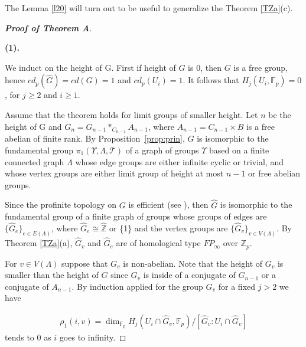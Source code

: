 \documentclass[10pt]{amsart}
\theoremstyle{plain}
\theoremstyle{definition}
\theoremstyle{remark}
\numberwithin{prop}{section}
\numberwithin{example}{section}
\numberwithin{equation}{section}
\newcommand{\Z}{\mathbb{Z}}
\newcommand{\F}{\mathbb{F}}
\newcommand{\caT}{\mathcal{T}}
\begin{document}
	The Lemma \ref{l20}  will  turn out to be useful to generalize  the Theorem \ref{TZa}(c). 
\begin{proof}[\textbf{Proof of Theorem A}]
	
	
\noindent
		\\ \item[\textbf{(1).}]
		
		We induct on the height of G. First if height of $G$ is 0, then $G$ is a 
		free group, hence  $cd_p(\widehat{G} )=cd(G)=1$ and  $cd_p(U_i)= 1$. It follows that  $H_j(U_i,\F_p)=0$, for $j\geq 2$ and $i\geq 1$. 
		
		Assume that the theorem holds for limit groups  of smaller height.  Let
		$n$ be the height of G and $G_n=G_{n-1}*_{C_{n-1}}A_{n-1}$, where $A_{n-1}=C_{n-1}\times B$ is a free abelian of finite rank. By Proposition~\ref{prop:prin},
		$G$ is isomorphic to the fundamental group $\pi_1(\Upsilon,\Lambda,\caT)$
		of a graph of groups $\Upsilon$ based on a finite connected graph $\Lambda$ whose edge groups are either infinite cyclic or trivial, and whose vertex groups are either limit group of height at most $n-1$ or free abelian groups.
		
		
		Since the profinite topology on $G$ is efficient (see  \cite[\S 3, Thm.~3.8]{gru} ), then $\widehat{G}$ is isomorphic to the fundamental group of a finite graph of groups whose groups of edges are $\{\widehat{G}_e\}_{e\in E(\Lambda)}$, where $\widehat{G}_e\cong \widehat{\Z}$ or \{1\} and the vertex groups are
		$\{\widehat{G}_v\}_{v\in V(\Lambda)}$. 	By Theorem \ref{TZa}(a), $\widehat{G}_v$ and  $\widehat{G}_e$ are of homological type $FP_{\infty}$  over $\Z_p$. 
		
		For $v\in V(\Lambda)$ suppose that $G_v$ is non-abelian. Note that the height of $G_v$ is smaller than the height of $G$ since $G_v$ is inside of 	a conjugate of $G_{n-1}$ or a conjugate of $A_{n-1}$. By induction applied for the group
		$G_v$ 	for a fixed $j>2$ we have
		
		
		
		\begin{align}
			\rho_1(i,v)=\dim_{\F_p}{H_j(U_i\cap \widehat{G}_v,\F_p)}/[\widehat{G}_v:U_i\cap \widehat{G}_v]
		\end{align}
		tends to 0 as $i$ goes to infinity.
		

\end{proof}
\end{document}
